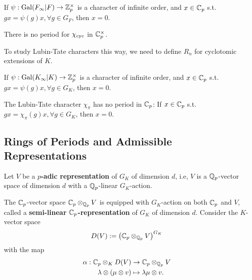 \begin{theorem}
    If $\psi : \operatorname{Gal}(F_\infty|F)\to\mathbb{Z}_p^\times$
    is a character of infinite order,
    and $x\in\mathbb{C}_p$ s.t. $gx = \psi(g)x, \forall g\in G_F$, then $x = 0$.
\end{theorem}

\begin{corollary}
    There is no period for $\chi_{\mathrm{cyc}}$ in $\mathbb{C}_p^\times$.
\end{corollary}

To study Lubin-Tate characters this way, we need to define $R_n$ for cyclotomic extensions of $K$.

\begin{corollary}
    If $\psi : \operatorname{Gal}(K_\infty|K)\to\mathbb{Z}_p^\times$
    is a character of infinite order,
    and $x\in\mathbb{C}_p$ s.t. $gx = \psi(g)x, \forall g\in G_K$, then $x = 0$.
\end{corollary}

\begin{corollary}
    The Lubin-Tate character $\chi_\pi$ has no period in $\mathbb{C}_p$:
    If $x\in\mathbb{C}_p$ s.t. $gx = \chi_\pi(g)x, \forall g\in G_K$, then $x = 0$.
\end{corollary}


\subsection{Rings of Periods and Admissible Representations}

Let $V$ be a \textbf{$p$-adic representation} of $G_K$ of dimension $d$, i.e, $V$ is a $\mathbb{Q}_p$-vector space of dimension $d$ with a $\mathbb{Q}_p$-linear $G_K$-action.

The $\mathbb{C}_p$-vector space $\mathbb{C}_p\otimes_{\mathbb{Q}_p} V$ is equipped with $G_K$-action on both $\mathbb{C}_p$ and $V$,
called a \textbf{semi-linear $\mathbb{C}_p$-representation} of $G_K$ of dimension $d$.
Consider the $K$-vector space \[D(V) := \left( \mathbb{C}_p\otimes_{\mathbb{Q}_p} V  \right)^{G_K}\]
with the map \begin{align*}
    \alpha : \mathbb{C}_p\otimes_{K} D(V)&\to \mathbb{C}_p\otimes_{\mathbb{Q}_p} V\\
    \lambda\otimes(\mu\otimes v)&\mapsto \lambda\mu\otimes v.
\end{align*}




